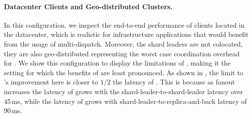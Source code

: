 \paragraph{Datacenter Clients and Geo-distributed Clusters.}
In this configuration, we inspect the end-to-end performance of clients located in the datacenter, which is realistic for infrastructure applications that would benefit from the usage of multi-dispatch. Moreover, the shard leaders are not colocated, they are also geo-distributed representing the worst case coordination overhead for \sys{}. We show this configuration to display the limitations of \sys{}, making it the setting for which the benefits of \sys{} are least pronounced. As shown in , the limit to \sys{}'s improvement here is closer to $1/2$ the latency of \mpaxos{}. This is because as fanout increases the latency of \sys{} grows with the shard-leader-to-shard-leader latency over 45\,ms, while the latency of \mpaxos{} grows with shard-leader-to-replica-and-back latency of 90\,ms.




